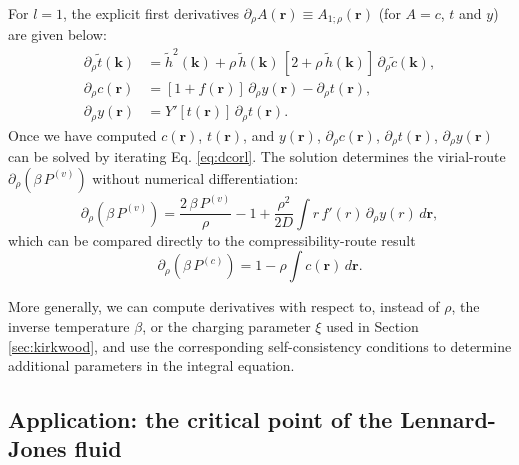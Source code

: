 \documentclass[aip,jcp,preprint,superscriptaddress,showpacs,preprintnumbers,amsmath,amssymb]{revtex4-1}
\numberwithin{equation}{section}
\newcommand{\vct}[1]{\mathbf{#1}}
\providecommand{\vr}{} %
\renewcommand{\vr}{\vct{r}}
\newcommand{\vk}{\vct{k}}
\begin{document}
For $l = 1$,
the explicit first derivatives
$\partial_\rho A(\vr) \equiv A_{1;\rho}(\vr)$
(for $A = c$, $t$ and $y$)
are given below:
%
%
%
\begin{equation}
\begin{split}
\partial_\rho \tilde t(\vk)
&=
\tilde h^2(\vk)
+
\rho \, \tilde h(\vk) \,
[2 + \rho \, \tilde h(\vk)] \, \partial_\rho \tilde c(\vk),
\\
%
\partial_\rho c(\vr)
&=
[1 + f(\vr)] \, \partial_\rho y(\vr)
- \partial_\rho t(\vr),
\\
\partial_\rho y(\vr)
&=
Y'[t(\vr)] \, \partial_\rho t(\vr).
\end{split}
\label{eq:dcorl}
\end{equation}
%
%
%
Once we have computed
$c(\vr)$, $t(\vr)$, and $y(\vr)$,
$\partial_\rho c(\vr)$,
$\partial_\rho t(\vr)$,
$\partial_\rho y(\vr)$
can be solved by iterating Eq. \eqref{eq:dcorl}.
%
The solution determines the virial-route
$\partial_\rho \left( \beta \, P^{(v)} \right)$
without numerical differentiation:
%
%
%
\[
\partial_\rho (\beta \, P^{(v)})
=
\frac{ 2 \, \beta \, P^{(v)} } { \rho } - 1
+ \frac{ \rho^2 } { 2 D }
  \int r \, f'(r) \, \partial_\rho y(r) \, d\vr,
\]
%
%
%
which can be compared directly to
the compressibility-route result
%
\[
\partial_\rho \left( \beta \, P^{(c)} \right)
=
1 - \rho \int c(\vr) \, d\vr.
\]



More generally,
we can compute derivatives with respect to,
instead of $\rho$,
the inverse temperature $\beta$,
or the charging parameter $\xi$
used in Section \ref{sec:kirkwood},
and use the corresponding self-consistency conditions
to determine additional parameters
in the integral equation.





\subsection{Application: the critical point of the Lennard-Jones fluid}
\end{document}
